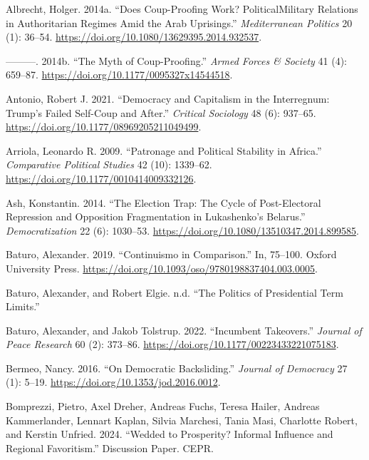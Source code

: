 \documentclass[
  12pt,
]{report}
\newlength{\cslhangindent}
\newenvironment{CSLReferences}[2] %
 {\begin{list}{}{%
  \setlength{\itemindent}{0pt}
  \setlength{\leftmargin}{0pt}
  \setlength{\parsep}{0pt}
  \ifodd #1
   \setlength{\leftmargin}{\cslhangindent}
   \setlength{\itemindent}{-1\cslhangindent}
  \fi
  \setlength{\itemsep}{#2\baselineskip}}}
 {\end{list}}
\begin{document}
\label{refs}
\begin{CSLReferences}{1}{0}
Albrecht, Holger. 2014a. {``Does Coup-Proofing Work?
Political{\textendash}Military Relations in Authoritarian Regimes Amid
the Arab Uprisings.''} \emph{Mediterranean Politics} 20 (1): 36--54.
\url{https://doi.org/10.1080/13629395.2014.932537}.

---------. 2014b. {``The Myth of Coup-Proofing.''} \emph{Armed Forces \&
Society} 41 (4): 659--87.
\url{https://doi.org/10.1177/0095327x14544518}.

Antonio, Robert J. 2021. {``Democracy and Capitalism in the Interregnum:
Trump{'}s Failed Self-Coup and After.''} \emph{Critical Sociology} 48
(6): 937--65. \url{https://doi.org/10.1177/08969205211049499}.

Arriola, Leonardo R. 2009. {``Patronage and Political Stability in
Africa.''} \emph{Comparative Political Studies} 42 (10): 1339--62.
\url{https://doi.org/10.1177/0010414009332126}.

Ash, Konstantin. 2014. {``The Election Trap: The Cycle of Post-Electoral
Repression and Opposition Fragmentation in Lukashenko's Belarus.''}
\emph{Democratization} 22 (6): 1030--53.
\url{https://doi.org/10.1080/13510347.2014.899585}.

Baturo, Alexander. 2019. {``Continuismo in Comparison.''} In, 75--100.
Oxford University Press.
\url{https://doi.org/10.1093/oso/9780198837404.003.0005}.

Baturo, Alexander, and Robert Elgie. n.d. {``The Politics of
Presidential Term Limits.''}

Baturo, Alexander, and Jakob Tolstrup. 2022. {``Incumbent Takeovers.''}
\emph{Journal of Peace Research} 60 (2): 373--86.
\url{https://doi.org/10.1177/00223433221075183}.

Bermeo, Nancy. 2016. {``On Democratic Backsliding.''} \emph{Journal of
Democracy} 27 (1): 5--19. \url{https://doi.org/10.1353/jod.2016.0012}.

Bomprezzi, Pietro, Axel Dreher, Andreas Fuchs, Teresa Hailer, Andreas
Kammerlander, Lennart Kaplan, Silvia Marchesi, Tania Masi, Charlotte
Robert, and Kerstin Unfried. 2024. {``Wedded to Prosperity? Informal
Influence and Regional Favoritism.''} Discussion Paper. CEPR.


\end{CSLReferences}
\end{document}
